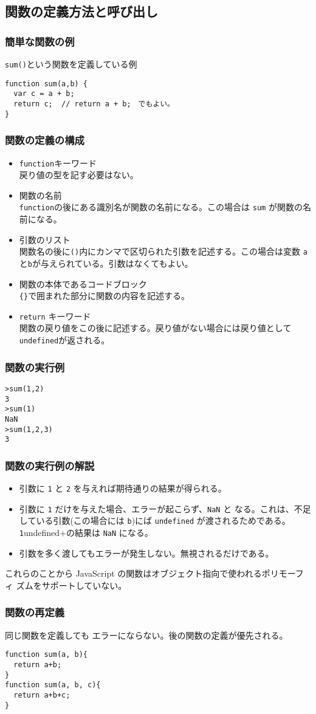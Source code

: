\subsection{関数の定義方法と呼び出し}
\begin{frame}[containsverbatim]
\frametitle{簡単な関数の例}
\Verb+sum()+という関数を定義している例
\begin{Verbatim}
function sum(a,b) {
  var c = a + b;
  return c;  // return a + b;　でもよい。
}
\end{Verbatim}
\end{frame}
\begin{frame}[containsverbatim]
\frametitle{関数の定義の構成}
\begin{itemize}
 \item \Verb+function+キーワード\\
戻り値の型を記す必要はない。
 \item 関数の名前\\
\Verb+function+の後にある識別名が関数の名前になる。この場合は \Verb+sum+
       が関数の名前になる。
 \item 引数のリスト\\
関数名の後に\Verb+()+内にカンマで区切られた引数を記述する。この場合は変数
       \Verb+a+と\Verb+b+が与えられている。引数はなくてもよい。
 \item 関数の本体であるコードブロック\\
\Verb+{}+で囲まれた部分に関数の内容を記述する。
\item \Verb+return+ キーワード\\
関数の戻り値をこの後に記述する。戻り値がない場合には戻り値として
       \Verb+undefined+が返される。
\end{itemize}
\end{frame}
\begin{frame}[containsverbatim]
\frametitle{関数の実行例}
\begin{Verbatim}
>sum(1,2)
3
>sum(1)
NaN
>sum(1,2,3)
3
\end{Verbatim} 
\end{frame}
\begin{frame}[containsverbatim]
\frametitle{関数の実行例の解説}
\begin{itemize}
 \item 引数に \Verb+1+ と \Verb+2+ を与えれば期待通りの結果が得られる。
 \item 引数に \Verb+1+ だけを与えた場合、エラーが起こらず、\Verb+NaN+ と
       なる。これは、不足している引数(この場合には \Verb+b+)にば
       \Verb+undefined+ が渡されるためである。\Verb+1+undefined+の結果は
       \Verb+NaN+ になる。
 \item 引数を多く渡してもエラーが発生しない。無視されるだけである。
\end{itemize}
これらのことから JavaScript の関数はオブジェクト指向で使われるポリモーフィ
ズムをサポートしていない。
\end{frame}
\begin{frame}[containsverbatim]
\frametitle{関数の再定義}
同じ関数を定義しても
エラーにならない。後の関数の定義が優先される。
\begin{Verbatim}
function sum(a, b){
  return a+b;
}
function sum(a, b, c){
  return a+b+c;
}
\end{Verbatim}
\end{frame}
